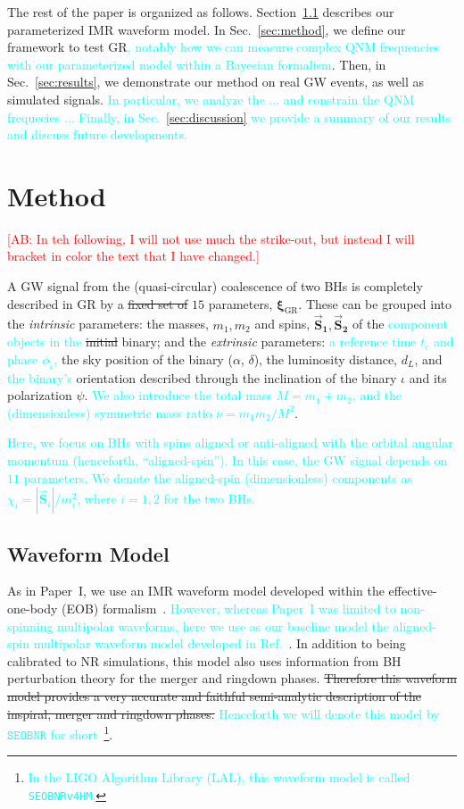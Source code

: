 \documentclass[twocolumn,prd,aps,superscriptaddress,preprintnumbers,tightenlines,showpacs,nofootinbib,eqsecnum,amsfonts,amsmath]{revtex4-1}
\newcommand{\paperone}{Paper~I\xspace}
\newcommand{\ab}[1]{\textcolor{cyan}{#1}}
\newcommand{\comment}[1]{\textcolor{red}{[#1]}}
\newcommand{\bxigr}{\bm{\xi}_{\text{GR}}}
\newcommand{\bs}[1]{\bm{\vec{S}_{#1}}}
\newcommand{\SEOB}{\texttt{SEOBNR}}
\begin{document}
The rest of the paper is organized as follows. Section~\ref{sec:model} describes our parameterized IMR
waveform model. In Sec.~\ref{sec:method}, we define our framework to test GR\ab{, notably how we can measure 
complex QNM frequencies with our parameterized model within a Bayesian formalism}. Then, in Sec.~\ref{sec:results}, 
we demonstrate our method on real GW events, as well as simulated signals. \ab{In particular, we analyze 
the ... and constrain the QNM frequecies ... Finally, in Sec.~\ref{sec:discussion} we provide a summary of
our results and discuss future developments.} 

\section{Method}

\comment{AB: In teh following, I will not use much the strike-out, but instead I will 
bracket in color the text that I have changed.}

A GW signal from the (quasi-circular) coalescence of two BHs is
completely described in GR by a \sout{fixed set of} $15$ parameters,
$\bxigr$. These can be grouped into the \emph{intrinsic} parameters:
the masses, $m_1, m_2$ and spins, $\bs1, \bs2$ of the \ab{component 
objects in the} \sout{initial} binary; and the 
\emph{extrinsic} parameters: \ab{a reference time $t_c$ and phase 
$\phi_c$,} the sky position of the binary ($\alpha$,
$\delta$), the luminosity distance, $d_L$, and \ab{the binary's} orientation
described through the inclination of the binary $\iota$ and its
polarization $\psi$. \ab{We also introduce the total mass $M = m_1+m_2$, 
and the (dimensionless) symmetric mass ratio $\nu = m_1m_2/M^2$}. 

\ab{Here, we focus on BHs with spins aligned or anti-aligned 
with the orbital angular momentum (henceforth, ``aligned-spin''). In this case,  
the GW signal depends on $11$ parameters. We denote the 
aligned-spin \ab{(dimensionless)} components as $\chi_{i} = |\vec{\bm{S}}_i|/m^2_i$, where $i=1,2$ for the two BHs.}

\subsection{Waveform Model}\label{sec:model}

As in \paperone, we use an IMR waveform model developed within the effective-one-body (EOB) 
formalism~\cite{}. \ab{However, whereas \paperone was limited to non-spinning multipolar waveforms, 
here we use as our baseline model the aligned-spin multipolar waveform model 
developed in Ref.~\citep{Cotesta:2018fcv}}. In addition to being
calibrated to NR simulations, this model also uses information from BH
perturbation theory for the merger and ringdown phases. \sout{Therefore this
waveform model provides a very accurate and faithful semi-analytic
description of the inspiral, merger and ringdown phases.} \ab{Henceforth we
will denote this model by $\SEOB$ for short}~\footnote{\ab{In the LIGO Algorithm Library (LAL), this 
waveform model is called {\tt SEOBNRv4HM}.}}.
\end{document}
